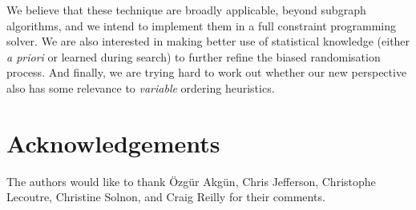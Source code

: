 \documentclass[runningheads]{llncs}
\begin{document}
We believe that these technique are broadly applicable, beyond subgraph algorithms, and we intend to
implement them in a full constraint programming solver. We are also interested in making better use
of statistical knowledge (either \emph{a priori} or learned during search) to further refine the
biased randomisation process. And finally, we are trying hard to work out whether our new
perspective also has some relevance to \emph{variable} ordering heuristics.

\section*{Acknowledgements}

The authors would like to thank \"{O}zg\"{u}r Akg\"{u}n, Chris Jefferson, Christophe Lecoutre, Christine
Solnon, and Craig Reilly for their comments.



\end{document}
